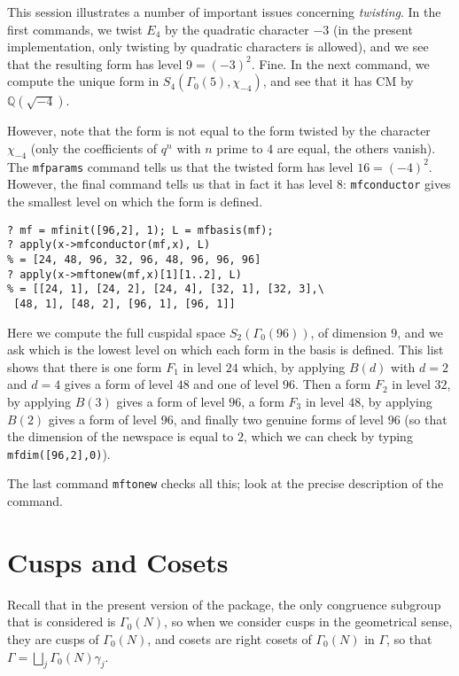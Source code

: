 \documentclass[11pt]{article}
\newcommand{\Q}{{\mathbb Q}}
\newcommand{\ga}{\gamma}
\newcommand{\G}{\Gamma}
\def\kbd#1{{\tt #1}}
\begin{document}
  This session illustrates a number of important issues concerning
  \emph{twisting}. In the first commands, we twist $E_4$ by the quadratic
  character $-3$ (in the present implementation, only twisting by quadratic
  characters is allowed), and we see that the resulting form has level
  $9=(-3)^2$. Fine. In the next command, we compute the unique form
  in $S_4(\G_0(5),\chi_{-4})$, and see that it has CM by $\Q(\sqrt{-4})$.

  However, note that the form is not equal to the form twisted by the
  character $\chi_{-4}$ (only the coefficients of $q^n$ with $n$ prime to $4$
  are equal, the others vanish). The \kbd{mfparams} command tells us that
  the twisted form has level $16=(-4)^2$. However, the final command tells
  us that in fact it has level $8$: \kbd{mfconductor} gives the smallest
  level on which the form is defined.

\begin{verbatim}
? mf = mfinit([96,2], 1); L = mfbasis(mf);
? apply(x->mfconductor(mf,x), L)
% = [24, 48, 96, 32, 96, 48, 96, 96, 96]
? apply(x->mftonew(mf,x)[1][1..2], L)
% = [[24, 1], [24, 2], [24, 4], [32, 1], [32, 3],\
 [48, 1], [48, 2], [96, 1], [96, 1]]
\end{verbatim}

Here we compute the full cuspidal space $S_2(\G_0(96))$, of dimension $9$,
and we ask which is the lowest level on which each form in the basis
is defined. This list shows that there is one form $F_1$ in level $24$
which, by applying $B(d)$ with $d=2$ and $d=4$ gives a form of level $48$
and one of level $96$. Then a form $F_2$ in level $32$, by applying $B(3)$
gives a form of level $96$, a form $F_3$ in level $48$, by applying $B(2)$
gives a form of level $96$, and finally two genuine forms of level $96$
(so that the dimension of the newspace is equal to $2$, which we can check
by typing \kbd{mfdim([96,2],0)}).

The last command \kbd{mftonew} checks all this; look at the precise description
of the command.

\section{Cusps and Cosets}

Recall that in the present version of the package, the only congruence
subgroup that is considered is $\G_0(N)$, so when we consider cusps in
the geometrical sense, they are cusps of $\G_0(N)$, and cosets are
right cosets of $\G_0(N)$ in $\G$, so that $\G=\bigsqcup_j\G_0(N)\ga_j$.
\end{document}
